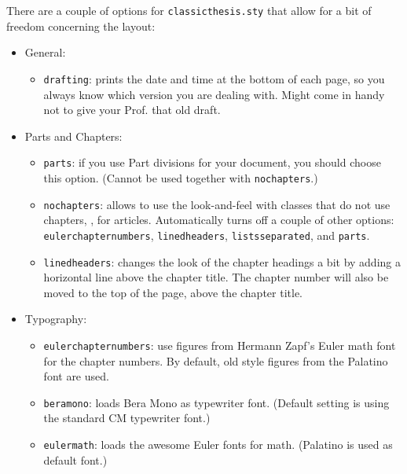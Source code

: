 There are a couple of options for \texttt{classicthesis.sty} that
allow for a bit of freedom concerning the layout:
\begin{itemize}
	\item General:
		\begin{itemize}
			\item\texttt{drafting}: prints the date and time at the bottom of
    each page, so you always know which version you are dealing with.
    Might come in handy not to give your Prof. that old draft.
		\end{itemize}
	
	\item Parts and Chapters:
		\begin{itemize}
			\item\texttt{parts}: if you use Part divisions for your document,
    you should choose this option. (Cannot be used together with 
    \texttt{nochapters}.)
    
			\item\texttt{nochapters}: allows to use the look-and-feel with 
    classes that do not use chapters, \eg, for articles. Automatically
    turns off a couple of other options: \texttt{eulerchapternumbers}, 
    \texttt{linedheaders}, \texttt{listsseparated}, and \texttt{parts}. 
    
	    \item\texttt{linedheaders}: changes the look of the chapter
	    headings a bit by adding a horizontal line above the chapter
	    title. The chapter number will also be moved to the top of the
	    page, above the chapter title.
    
		\end{itemize}

  \item Typography:
		\begin{itemize}
				\item\texttt{eulerchapternumbers}: use figures from Hermann Zapf's
    Euler math font for the chapter numbers. By default, old style
    figures from the Palatino font are used.
    
        \item\texttt{beramono}: loads Bera Mono as typewriter font. 
    (Default setting is using the standard CM typewriter font.)
    \item\texttt{eulermath}: loads the awesome Euler fonts for math. 
    (Palatino is used as default font.)
    

\end{itemize}
\end{itemize}
